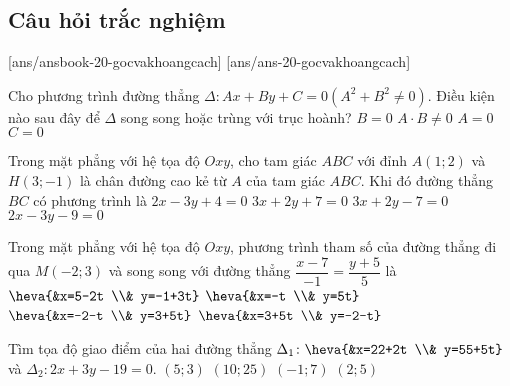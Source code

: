 \subsection{Câu hỏi trắc nghiệm}
	[ans/ansbook-20-gocvakhoangcach]
	[ans/ans-20-gocvakhoangcach]
	\begin{ex}%
		Cho phương trình đường thẳng $\Delta \colon Ax+By+C=0\left(A^2+B^2 \ne 0\right)$. Điều kiện nào sau đây để $\Delta$ song song hoặc trùng với trục hoành?
		\choice
		{$B=0$}
		{$A\cdot B \ne 0$}
		{\True $A=0$}
		{$C=0$}
	\end{ex}
	\begin{ex}%
		Trong mặt phẳng với hệ tọa độ $Oxy$, cho tam giác $ABC$ với đỉnh $A(1;2)$ và $H(3;-1)$ là chân đường cao kẻ từ $A$ của tam giác $ABC$. Khi đó đường thẳng $BC$ có phương trình là
		\choice
		{$2x-3y+4=0$}
		{$3x+2y+7=0$}
		{$3x+2y-7=0$}
		{\True $2x-3y-9=0$}
	\end{ex}
	\begin{ex}%
		Trong mặt phẳng với hệ tọa độ $Oxy$, phương trình tham số của đường thẳng đi qua $M(-2;3)$ và song song với đường thẳng $\dfrac{x-7}{-1}=\dfrac{y+5}{5}$ là
		\choice
		{$\heva{&x=5-2t \\& y=-1+3t}$}
		{$\heva{&x=-t \\& y=5t}$}
		{\True $\heva{&x=-2-t \\& y=3+5t}$}
		{$\heva{&x=3+5t \\& y=-2-t}$}
	\end{ex}
	\begin{ex}%
		Tìm tọa độ giao điểm của hai đường thẳng $\Delta_1 \colon \heva{&x=22+2t \\& y=55+5t}$ và $\Delta_2 \colon 2x+3y-19=0$.
		\choice
		{$(5;3)$}
		{$(10;25)$}
		{$(-1;7)$}
		{\True $(2;5)$}
	\end{ex}
